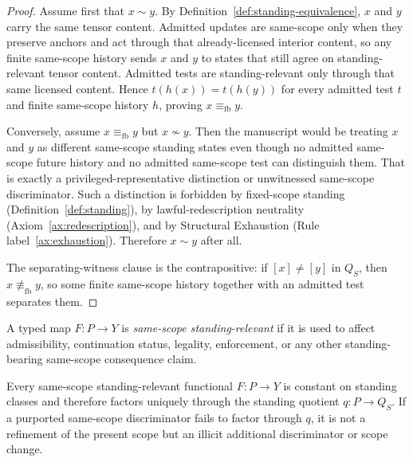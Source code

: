 \begin{proof}
Assume first that $x\sim y$. By Definition~\ref{def:standing-equivalence}, $x$ and $y$ carry the same tensor content. Admitted updates are same-scope only when they preserve anchors and act through that already-licensed interior content, so any finite same-scope history sends $x$ and $y$ to states that still agree on standing-relevant tensor content. Admitted tests are standing-relevant only through that same licensed content. Hence $t(h(x))=t(h(y))$ for every admitted test $t$ and finite same-scope history $h$, proving $x\equiv_{\mathrm{fb}} y$.

Conversely, assume $x\equiv_{\mathrm{fb}} y$ but $x\not\sim y$. Then the manuscript would be treating $x$ and $y$ as different same-scope standing states even though no admitted same-scope future history and no admitted same-scope test can distinguish them. That is exactly a privileged-representative distinction or unwitnessed same-scope discriminator. Such a distinction is forbidden by fixed-scope standing (Definition~\ref{def:standing}), by lawful-redescription neutrality (Axiom~\ref{ax:redescription}), and by Structural Exhaustion (Rule label~\ref{ax:exhaustion}). Therefore $x\sim y$ after all.

The separating-witness clause is the contrapositive: if $[x]\neq [y]$ in $Q_S$, then $x\not\equiv_{\mathrm{fb}} y$, so some finite same-scope history together with an admitted test separates them.
\end{proof}

\begin{definition}\label{def:same-scope-standing-functional}
A typed map $F:P\to Y$ is \emph{same-scope standing-relevant} if it is used to affect admissibility, continuation status, legality, enforcement, or any other standing-bearing same-scope consequence claim.
\end{definition}

\begin{theorem}\label{thm:factorization-discipline-same-scope}
Every same-scope standing-relevant functional $F:P\to Y$ is constant on standing classes and therefore factors uniquely through the standing quotient $q:P\to Q_S$. If a purported same-scope discriminator fails to factor through $q$, it is not a refinement of the present scope but an illicit additional discriminator or scope change.
\end{theorem}

